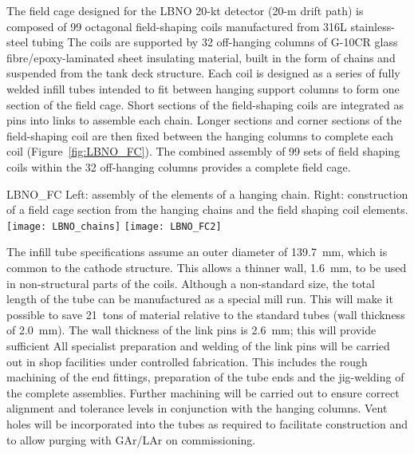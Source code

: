 The field cage designed for the LBNO 20-kt detector (20-m drift
path) is composed of 99 octagonal field-shaping coils manufactured
from 316L stainless-steel tubing  
The coils are supported by 32 off-hanging columns of G-10CR
glass fibre/epoxy-laminated sheet insulating material, built in the form of chains and suspended from the tank deck structure. %
Each  coil is designed as a series of fully welded infill tubes intended to
fit between  hanging support columns to form one section of the field cage.  Short sections
of the field-shaping coils are integrated as pins into links to assemble each
chain.  Longer sections and 
corner sections of the field-shaping coil are then fixed between the hanging columns to complete
each coil (Figure~\ref{fig:LBNO_FC}). The combined assembly of 99 sets  %
of field shaping coils within the 32 off-hanging columns provides
a complete field cage.
\begin{cdrfigure}{LBNO_FC}
{\small Left: assembly of the elements of a hanging chain. Right: 
construction of a field cage section from the hanging chains and the field shaping coil elements.}
\texttt{[image: LBNO\_chains]} \hfill
\texttt{[image: LBNO\_FC2]}
\end{cdrfigure}

The infill tube specifications assume %
an outer diameter of 139.7~mm, which
is common to the cathode structure. %
This allows a thinner wall, 1.6~mm, %
to be used %
in non-structural parts of the %
coils.  Although a non-standard size, the total length of the %
tube %
can be
manufactured as a special mill run. %
This will make it possible to save 21~tons of material relative to the standard tubes
(wall thickness of 2.0~mm). The wall thickness of the link pins 
is 2.6~mm; this will provide sufficient  All specialist preparation and
welding of the link pins will be carried out in shop facilities under controlled
fabrication.  This includes the rough machining
of the end fittings, preparation of the tube ends and the jig-welding
of the complete assemblies. Further machining %
will be
carried out to ensure correct alignment and tolerance levels in
conjunction with the hanging columns.  Vent holes will be incorporated
into the tubes as required to facilitate construction and to allow
purging with GAr/LAr on commissioning.

